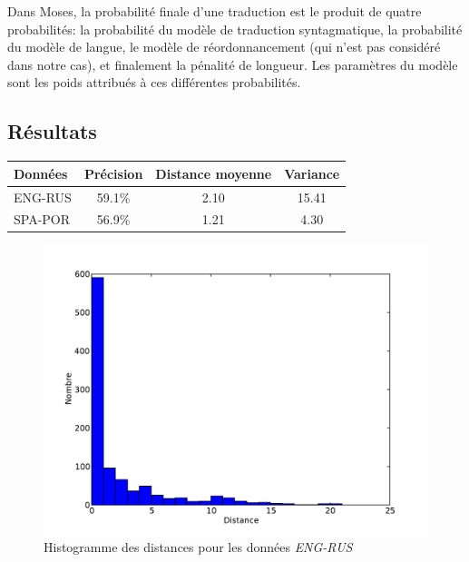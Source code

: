 \documentclass{article}
\begin{document}
Dans Moses, la probabilité finale d'une traduction est le produit de quatre probabilités: la probabilité du modèle de traduction syntagmatique, la probabilité du modèle de langue, le modèle de réordonnancement (qui n'est pas considéré dans notre cas), et finalement la pénalité de longueur. Les paramètres du modèle sont les poids attribués à ces différentes probabilités.

\subsection{Résultats}

\begin{center}
\begin{tabular}{|l|c|c|c|}
\hline
Données&Précision&Distance moyenne&Variance\\
\hline
ENG-RUS&59.1\%&2.10&15.41\\
\hline
SPA-POR&56.9\%&1.21&4.30\\
\hline
\end{tabular}
\end{center}

\begin{figure}[H]
\begin{center}
    \caption{Histogramme des distances pour les données \emph{ENG-RUS}}
    \includegraphics[scale=0.5]{moses_histogram.pdf}
\end{center}
\end{figure}
\end{document}
